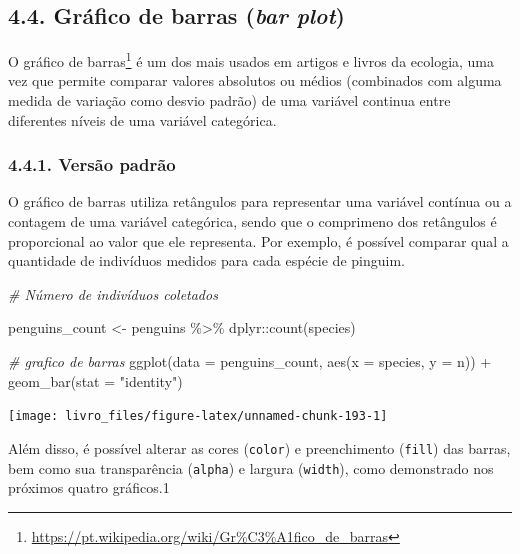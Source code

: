 \documentclass[
]{book}
\newenvironment{Shaded}{\begin{snugshade}}{\end{snugshade}}
\newcommand{\AttributeTok}[1]{\textcolor[rgb]{0.61,0.61,0.61}{#1}}
\newcommand{\CommentTok}[1]{\textcolor[rgb]{0.37,0.37,0.37}{\textit{#1}}}
\newcommand{\FunctionTok}[1]{\textcolor[rgb]{0,0,0}{#1}}
\newcommand{\NormalTok}[1]{#1}
\newcommand{\OtherTok}[1]{\textcolor[rgb]{0.37,0.37,0.37}{#1}}
\newcommand{\SpecialCharTok}[1]{\textcolor[rgb]{0,0,0}{#1}}
\newcommand{\StringTok}[1]{\textcolor[rgb]{0.5,0.5,0.5}{#1}}
\renewcommand{\href}[2]{#2\footnote{\url{#1}}}
\begin{document}
\hypertarget{bars}{%
\subsection{\texorpdfstring{4.4. Gráfico de barras (\emph{bar plot})}{4.4. Gráfico de barras (bar plot)}}\label{bars}}

O \href{https://pt.wikipedia.org/wiki/Gr\%C3\%A1fico_de_barras}{gráfico de barras} é um dos mais usados em artigos e livros da ecologia, uma vez que permite comparar valores absolutos ou médios (combinados com alguma medida de variação como desvio padrão) de uma variável continua entre diferentes níveis de uma variável categórica.

\hypertarget{versuxe3o-padruxe3o-3}{%
\subsubsection{4.4.1. Versão padrão}\label{versuxe3o-padruxe3o-3}}

O gráfico de barras utiliza retângulos para representar uma variável contínua ou a contagem de uma variável categórica, sendo que o comprimeno dos retângulos é proporcional ao valor que ele representa. Por exemplo, é possível comparar qual a quantidade de indivíduos medidos para cada espécie de pinguim.

\begin{Shaded}
\begin{Highlighting}[]
\CommentTok{\# Número de indivíduos coletados}

\NormalTok{penguins\_count }\OtherTok{\textless{}{-}}\NormalTok{ penguins }\SpecialCharTok{\%\textgreater{}\%}
\NormalTok{  dplyr}\SpecialCharTok{::}\FunctionTok{count}\NormalTok{(species)}

\CommentTok{\# grafico de barras}
\FunctionTok{ggplot}\NormalTok{(}\AttributeTok{data =}\NormalTok{ penguins\_count, }
       \FunctionTok{aes}\NormalTok{(}\AttributeTok{x =}\NormalTok{ species, }\AttributeTok{y =}\NormalTok{ n)) }\SpecialCharTok{+} 
  \FunctionTok{geom\_bar}\NormalTok{(}\AttributeTok{stat =} \StringTok{"identity"}\NormalTok{)}
\end{Highlighting}
\end{Shaded}

\begin{center}\texttt{[image: livro\_files/figure-latex/unnamed-chunk-193-1]} \end{center}

Além disso, é possível alterar as cores (\texttt{color}) e preenchimento (\texttt{fill}) das barras, bem como sua transparência (\texttt{alpha}) e largura (\texttt{width}), como demonstrado nos próximos quatro gráficos.1
\end{document}

